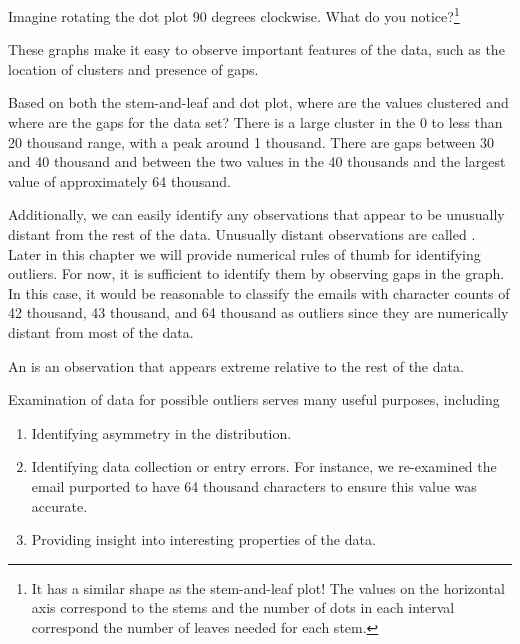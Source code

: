 \begin{exercise}
Imagine rotating the dot plot 90 degrees clockwise. What do you notice?\footnote{It has a similar shape as the stem-and-leaf plot! The values on the horizontal axis correspond to the stems and the number of dots in each interval correspond the number of leaves needed for each stem.}
\end{exercise}

These graphs make it easy to observe important features of the data, such as the location of clusters and presence of gaps.

\begin{example}{Based on both the stem-and-leaf and dot plot, where are the values clustered and where are the gaps for the  data set?}
There is a large cluster in the 0 to less than 20 thousand range, with a peak around 1 thousand. There are gaps between 30 and 40 thousand and between the two values in the 40 thousands and the largest value of approximately 64 thousand.
\end{example}

Additionally, we can easily identify any observations that appear to be unusually distant from the rest of the data. Unusually distant observations are called . Later in this chapter we will provide numerical rules of thumb for identifying outliers. For now, it is sufficient to identify them by observing gaps in the graph. In this case, it would be reasonable to classify the emails with character counts of 42 thousand, 43 thousand, and 64 thousand as outliers since they are numerically distant from most of the data.


\begin{termBox}{
An  is an observation that appears extreme relative to the rest of the data.}
\end{termBox}


\begin{tipBox}{
Examination of data for possible outliers serves many useful purposes, including\vspace{-2mm}
\begin{enumerate}
\setlength{\itemsep}{0mm}
\item Identifying asymmetry in the distribution.
\item Identifying data collection or entry errors. For instance, we re-examined the email purported to have 64 thousand characters to ensure this value was accurate.
\item Providing insight into interesting properties of the data.\vspace{0.5mm}
\end{enumerate}}
\end{tipBox}

